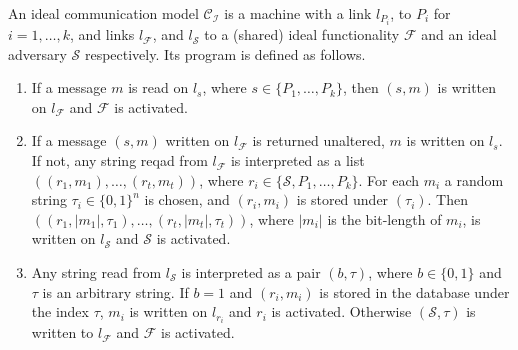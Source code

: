 \documentclass{acm_proc_article-sp}
\begin{document}
\begin{defAppendix}
An ideal communication model $\mathcal{C_I}$ is a machine with a link $l_{P_i}$, to
$P_i$ for $i = 1, \ldots, k$,
and links $l_\mathcal{F}$, and $l_\mathcal{S}$ to a (shared) ideal functionality $\mathcal{F}$
and an ideal adversary $\mathcal{S}$ respectively. Its program is defined as follows.
\begin{enumerate}
  \item If a message $m$ is read on $l_s$, where $s \in \{P_1, \ldots, P_k\}$,
        then $(s, m)$ is written on $l_\mathcal{F}$ and $\mathcal{F}$ is activated.
  \item If a message $(s, m)$ written on $l_\mathcal{F}$ is returned unaltered, $m$ is
        written on $l_s$. If not, any string reqad from $l_\mathcal{F}$ is interpreted
        as a list $((r_1, m_1), \ldots, (r_t, m_t))$, where $r_i \in \{\mathcal{S},
        P_1, \ldots, P_k\}$. For each $m_i$ a random string $\tau_i \in \{0, 1\}^n$ is
        chosen, and $(r_i, m_i)$ is stored under $(\tau_i)$. Then $((r_1, |m_1|, \tau_1),
        \ldots, (r_t, |m_t|, \tau_t))$, where $|m_i|$ is the bit-length of $m_i$, is
        written on $l_\mathcal{S}$ and $\mathcal{S}$ is activated.
  \item Any string read from $l_\mathcal{S}$ is interpreted as a pair $(b, \tau)$, where
        $b \in \{0, 1\}$ and $\tau$ is an arbitrary string. If $b = 1$ and $(r_i, m_i)$
        is stored in the database under the index $\tau$, $m_i$ is written on $l_{r_i}$
        and $r_i$ is activated. Otherwise $(\mathcal{S}, \tau)$ is written to
       $l_\mathcal{F}$ and $\mathcal{F}$ is activated.
\end{enumerate}
\end{defAppendix}
\end{document}
